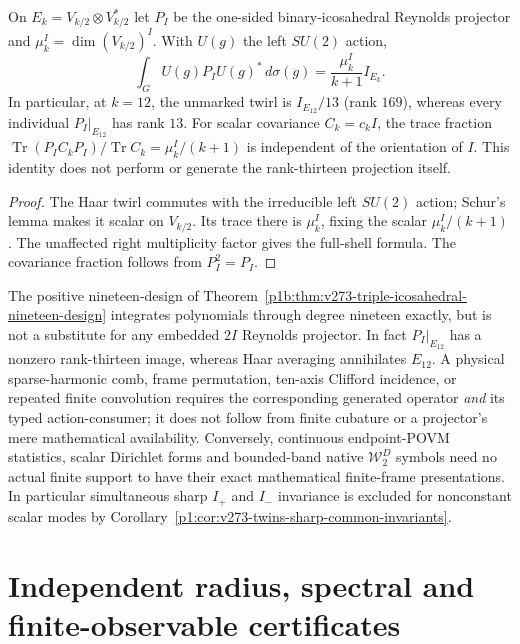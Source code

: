 \documentclass[11pt,a4paper]{article}
\begin{document}
\begin{corollary}
\label{p2f:cor:v273-icosahedral-projector-twirl}
On $E_k=V_{k/2}\otimes V_{k/2}^*$ let $P_I$ be the one-sided
binary-icosahedral Reynolds projector and
$\mu_k^I=\dim (V_{k/2})^I$. With $U(g)$ the left $SU(2)$ action,
\[
 \boxed{\int_GU(g)P_IU(g)^*\,d\sigma(g)
           =\frac{\mu_k^I}{k+1}I_{E_k}.}
\]
In particular, at $k=12$, the unmarked twirl is $I_{E_{12}}/13$
(rank $169$), whereas every individual $P_I|_{E_{12}}$ has rank $13$.
For scalar covariance $C_k=c_kI$, the trace fraction
$\operatorname{Tr}(P_IC_kP_I)/\operatorname{Tr}C_k
=\mu_k^I/(k+1)$ is independent of the orientation of $I$.
This identity does not perform or generate the rank-thirteen
projection itself.
\end{corollary}
\begin{proof}
The Haar twirl commutes with the irreducible left $SU(2)$ action;
Schur's lemma makes it scalar on $V_{k/2}$. Its trace there is
$\mu_k^I$, fixing the scalar $\mu_k^I/(k+1)$.
The unaffected right multiplicity factor gives the full-shell formula.
The covariance fraction follows from $P_I^2=P_I$.
\end{proof}

\begin{remark}
\label{p2f:rem:v273-finite-readout-versus-projection}
The positive nineteen-design of
Theorem~\ref{p1b:thm:v273-triple-icosahedral-nineteen-design}
integrates polynomials through degree nineteen exactly, but is not
a substitute for any embedded $2I$ Reynolds projector. In fact
$P_I|_{E_{12}}$ has a nonzero rank-thirteen image, whereas Haar
averaging annihilates $E_{12}$. A physical sparse-harmonic comb,
frame permutation, ten-axis Clifford incidence, or repeated finite
convolution requires the corresponding generated operator \emph{and}
its typed action-consumer; it does not follow from finite cubature
or a projector's mere mathematical availability. Conversely,
continuous endpoint-POVM statistics, scalar Dirichlet forms and
bounded-band native $\mathcal W_2^D$ symbols need no actual finite
support to have their exact mathematical finite-frame presentations.
In particular simultaneous sharp $I_+$ and $I_-$ invariance is
excluded for nonconstant scalar modes by
Corollary~\ref{p1:cor:v273-twins-sharp-common-invariants}.
\end{remark}




\section{Independent radius, spectral and finite-observable certificates}
\label{p2f:sec:v260-three-gap-closure}
\end{document}
